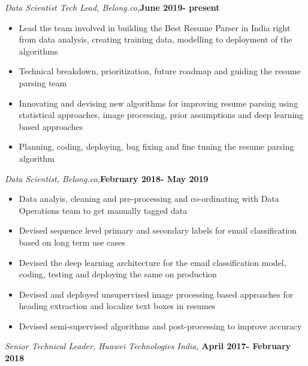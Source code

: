 \documentclass[line]{resume}
\begin{document}
{\begin{resume}
			\begin{list2}
			\item \emph{Data Scientist Tech Lead, Belong.co,}\hfill \textbf{June 2019- present}
			\begin{itemize}
			\item Lead the team involved in building the Best Resume Parser in India right from data analysis, creating training data, modelling to deployment of the algorithms
				\item Technical breakdown, prioritization, future roadmap and guiding the resume parsing team 
				\item Innovating and devising new algorithms for improving resume parsing using statistical approaches, image processing, prior assumptions and deep learning based approaches  
				\item Planning, coding, deploying, bug fixing and fine tuning the resume parsing algorithm
			\end{itemize}
				
			\item \emph{Data Scientist, Belong.co,}\hfill \textbf{February 2018- May 2019}
			\begin{itemize}
				\item Data analyis, cleaning and pre-processing and co-ordinating with Data Operations team to get manually tagged data
				\item Devised sequence level primary and secondary labels for email classification  based on long term use cases
				\item Devised  the deep learning architecture for the email  classification model, coding, testing and deploying the same on production
				\item Devised and deployed unsupervised image processing based approaches for heading extraction and localize text boxes in resumes
				\item Devised semi-supervised algorithms and post-processing  to improve accuracy
			\end{itemize}
			\item \emph{Senior Technical Leader, Huawei Technologies India,} \hfill \textbf{April 2017- February 2018}
			

\end{list2}
\end{resume}}
\end{document}
